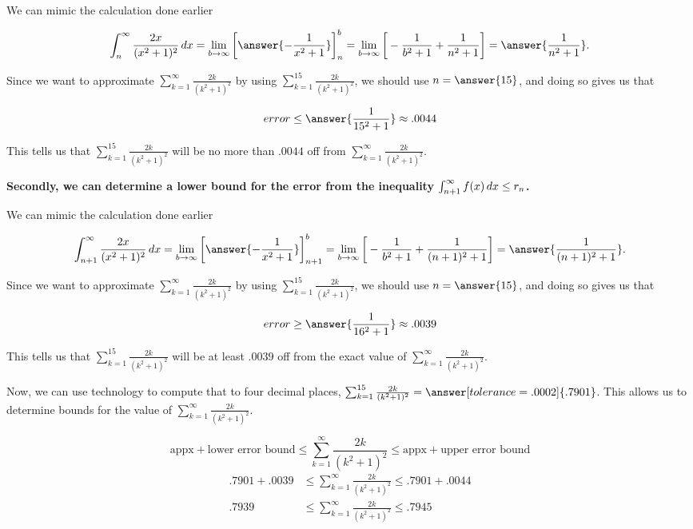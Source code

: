 \documentclass{ximera}
\begin{document}
\begin{exercise}
\begin{exercise}
We can mimic the calculation done earlier

\[
\int_n^\infty \frac{2x}{(x^2+1)^2} \d x = \lim_{b \to \infty} \eval{\answer{-\frac{1}{x^2+1}}}_n^b = \lim_{b \to \infty} \eval{-\frac{1}{b^2+1}+\frac{1}{n^2+1}} =\answer{\frac{1}{n^2+1}}. 
\]

Since we want to approximate $\sum_{k=1}^{\infty} \frac{2k}{(k^2+1)^2}$ by using $\sum_{k=1}^{15} \frac{2k}{(k^2+1)^2}$, we should use $n=\answer{15}$, and doing so gives us that

\[
error \leq \answer{\frac{1}{15^2+1}} \approx .0044
\]

This tells us that $\sum_{k=1}^{15} \frac{2k}{(k^2+1)^2}$ will be no more than $.0044$ off from $\sum_{k=1}^{\infty} \frac{2k}{(k^2+1)^2}$.

\textbf{Secondly, we can determine a lower bound for the error from the inequality $ \int_{n+1}^{\infty} f(x) \mathop{}\!d x  \leq r_n $. } 

We can mimic the calculation done earlier

\[
\int_{n+1}^\infty \frac{2x}{(x^2+1)^2} \d x = \lim_{b \to \infty} \eval{\answer{-\frac{1}{x^2+1}}}_{n+1}^b = \lim_{b \to \infty} \eval{-\frac{1}{b^2+1}+\frac{1}{(n+1)^2+1}} =\answer{\frac{1}{(n+1)^2+1}}. 
\]

Since we want to approximate $\sum_{k=1}^{\infty} \frac{2k}{(k^2+1)^2}$ by using $\sum_{k=1}^{15} \frac{2k}{(k^2+1)^2}$, we should use $n=\answer{15}$, and doing so gives us that

\[
error \geq \answer{\frac{1}{16^2+1}} \approx .0039
\]

This tells us that $\sum_{k=1}^{15} \frac{2k}{(k^2+1)^2}$ will be at least $.0039$ off from the exact value of  $\sum_{k=1}^{\infty} \frac{2k}{(k^2+1)^2}$.

\begin{exercise}
Now, we can use technology to compute that to four decimal places, $\sum_{k=1}^{15} \frac{2k}{(k^2+1)^2} = \answer[tolerance=.0002]{.7901}$.  This allows us to determine bounds for the value of $\sum_{k=1}^{\infty} \frac{2k}{(k^2+1)^2}$.

\[
\textrm{appx} + \textrm{lower error bound}  \leq \sum_{k=1}^{\infty} \frac{2k}{(k^2+1)^2}  \leq \textrm{appx} + \textrm{upper error bound} 
\]
\begin{align*}
.7901 +.0039 &\leq \sum_{k=1}^{\infty} \frac{2k}{(k^2+1)^2} \leq .7901 +.0044 \\
.7939 &\leq  \sum_{k=1}^{\infty} \frac{2k}{(k^2+1)^2} \leq .7945 
\end{align*}


\end{exercise}
\end{exercise}
\end{exercise}
\end{document}
